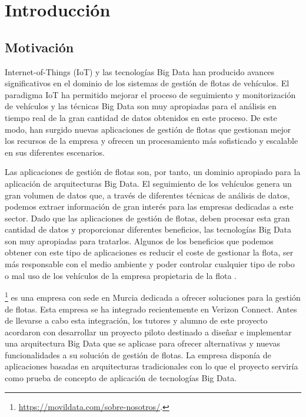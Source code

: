 
\chapter{Introducción\label{intro}}

\section{Motivación\label{motivacion}}

Internet-of-Things (IoT) y las tecnologías Big Data han producido
avances significativos en el dominio de los sistemas de gestión de
flotas de vehículos. El paradigma IoT ha permitido mejorar el proceso
de seguimiento y monitorización de vehículos y las técnicas Big Data
son muy apropiadas para el análisis en tiempo real de la gran cantidad
de datos obtenidos en este proceso\cite{1-1-3}. De este modo, han
surgido nuevas aplicaciones de gestión de flotas que gestionan mejor
los recursos de la empresa y ofrecen un procesamiento más sofisticado
y escalable en sus diferentes escenarios.


Las aplicaciones de gestión de flotas son, por tanto, un dominio
apropiado para la aplicación de arquitecturas Big Data. El seguimiento
de los vehículos genera un gran volumen de datos que, a través de
diferentes técnicas de análisis de datos, podemos extraer información
de gran interés para las empresas dedicadas a este sector. Dado que
las aplicaciones de gestión de flotas, deben procesar esta gran
cantidad de datos y proporcionar diferentes beneficios, las
tecnologías Big Data son muy apropiadas para tratarlos. Algunos de los
beneficios que podemos obtener con este tipo de aplicaciones es
reducir el coste de gestionar la flota, ser más responsable con el
medio ambiente y poder controlar cualquier tipo de robo o mal uso de
los vehículos de la empresa propietaria de la flota \cite{1-1-1,1-1-2}.

\mdata\footnote{\url{https://movildata.com/sobre-nosotros/}.} es
una empresa con sede en Murcia dedicada a ofrecer soluciones para la
gestión de flotas. Esta empresa se ha integrado recientemente en
Verizon Connect. Antes de llevarse a cabo esta integración, los
tutores y alumno de este proyecto acordaron con \mdata{} desarrollar
un proyecto piloto destinado a diseñar e implementar una arquitectura
Big Data que se aplicase para ofrecer alternativas y nuevas
funcionalidades a su solución de gestión de flotas. La empresa
disponía de aplicaciones basadas en arquitecturas tradicionales con lo
que el proyecto serviría como prueba de concepto de aplicación de
tecnologías Big Data.

